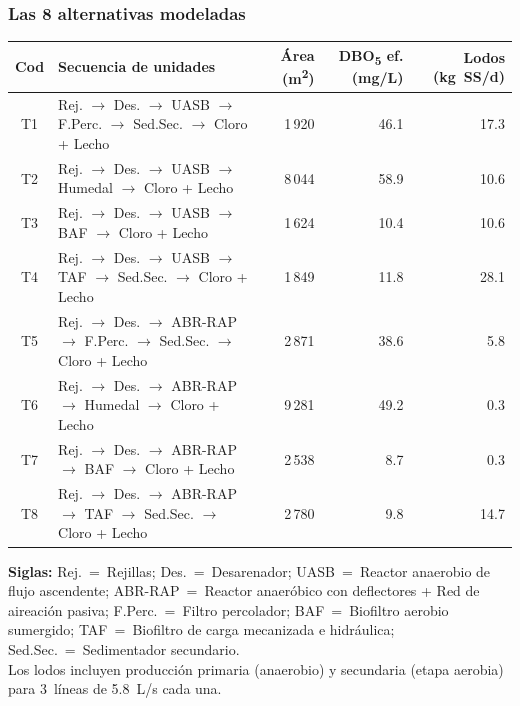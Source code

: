 \documentclass[aspectratio=169]{beamer}
\begin{document}
\begin{frame}
\frametitle{Las 8 alternativas modeladas}
\tiny
\renewcommand{\arraystretch}{1.0}
\begin{tabular}{cp{3.5cm}rrr}
\toprule
\textbf{Cod} & \textbf{Secuencia de unidades} & \textbf{\'{A}rea (m\textsuperscript{2})} & \textbf{DBO\textsubscript{5} ef. (mg/L)} & \textbf{Lodos (kg~SS/d)} \\
\midrule
T1 & Rej. $\rightarrow$ Des. $\rightarrow$ UASB $\rightarrow$ F.Perc. $\rightarrow$ Sed.Sec. $\rightarrow$ Cloro + Lecho & 1\,920 & 46.1 & 17.3 \\
T2 & Rej. $\rightarrow$ Des. $\rightarrow$ UASB $\rightarrow$ Humedal $\rightarrow$ Cloro + Lecho & 8\,044 & 58.9 & 10.6 \\
T3 & Rej. $\rightarrow$ Des. $\rightarrow$ UASB $\rightarrow$ BAF $\rightarrow$ Cloro + Lecho & 1\,624 & 10.4 & 10.6 \\
T4 & Rej. $\rightarrow$ Des. $\rightarrow$ UASB $\rightarrow$ TAF $\rightarrow$ Sed.Sec. $\rightarrow$ Cloro + Lecho & 1\,849 & 11.8 & 28.1 \\
T5 & Rej. $\rightarrow$ Des. $\rightarrow$ ABR-RAP $\rightarrow$ F.Perc. $\rightarrow$ Sed.Sec. $\rightarrow$ Cloro + Lecho & 2\,871 & 38.6 & 5.8 \\
T6 & Rej. $\rightarrow$ Des. $\rightarrow$ ABR-RAP $\rightarrow$ Humedal $\rightarrow$ Cloro + Lecho & 9\,281 & 49.2 & 0.3 \\
T7 & Rej. $\rightarrow$ Des. $\rightarrow$ ABR-RAP $\rightarrow$ BAF $\rightarrow$ Cloro + Lecho & 2\,538 & 8.7 & 0.3 \\
T8 & Rej. $\rightarrow$ Des. $\rightarrow$ ABR-RAP $\rightarrow$ TAF $\rightarrow$ Sed.Sec. $\rightarrow$ Cloro + Lecho & 2\,780 & 9.8 & 14.7 \\
\bottomrule
\end{tabular}

\vspace{4pt}
\scriptsize
\textbf{Siglas:} Rej.~=~Rejillas; Des.~=~Desarenador; UASB~=~Reactor anaerobio de flujo ascendente; ABR-RAP~=~Reactor anaer\'{o}bico con deflectores + Red de aireaci\'{o}n pasiva; F.Perc.~=~Filtro percolador; BAF~=~Biofiltro aerobio sumergido; TAF~=~Biofiltro de carga mecanizada e hidr\'{a}ulica; Sed.Sec.~=~Sedimentador secundario.\\[2pt]
Los lodos incluyen producci\'{o}n primaria (anaerobio) y secundaria (etapa aerobia) para 3~l\'{i}neas de 5.8~L/s cada una.
\end{frame}
\end{document}
